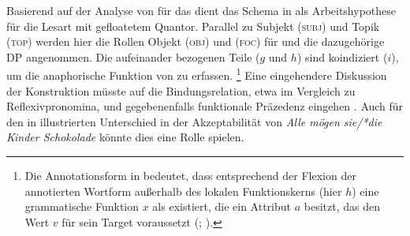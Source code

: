 Basierend auf der Analyse von \citet{spector2009} für das  dient das
Schema in  als Arbeits\-hypothese für die Lesart
mit gefloatetem Quantor. Parallel zu Subjekt (\textsc{subj}) und Topik
(\textsc{top}) werden hier die Rollen Objekt (\textsc{obj}) und 
(\textsc{foc}) für  und die dazugehörige
DP angenommen. Die aufeinander bezogenen Teile ($g$ und
$h$) sind koindiziert ($i$), um die anaphorische Funktion von
 zu erfassen.%
%
	\footnote{Die Annotationsform
		 in 
		bedeutet, dass entsprechend der Flexion der annotierten Wortform
		außerhalb des lokalen Funktionskerns (hier $h$) eine grammatische
		Funktion $x$ als  existiert, die ein
		Attribut $a$ besitzt, das den Wert $v$ für sein Target
		voraussetzt (;
		\cite[66--70]{bresnanetal2016}).}
%
Eine eingehendere Diskussion der Konstruktion müsste auf die
Bindungsrelation, etwa im Vergleich zu Reflexivpronomina, und
gegebenenfalls funktionale Präzedenz eingehen \autocite[vgl.][213,
254--285]{bresnanetal2016}. Auch für den in  illustrierten
Unterschied in der Akzeptabilität von \textit{Alle mögen sie/*die Kinder
Schokolade} könnte dies eine Rolle spielen.

